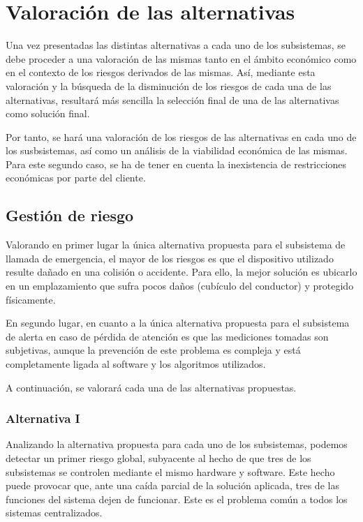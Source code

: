 \section{Valoración de las alternativas}
\par Una vez presentadas las distintas alternativas a cada uno de los subsistemas, se debe proceder a una valoración de las mismas tanto en el ámbito económico como en el contexto de los riesgos derivados de las mismas. Así, mediante esta valoración y la búsqueda de la disminución de los riesgos de cada una de las alternativas, resultará más sencilla la selección final de una de las alternativas como solución final.

\par Por tanto, se hará una valoración de los riesgos de las alternativas en cada uno de los susbsistemas, así como un análisis de la viabilidad económica de las mismas. Para este segundo caso, se ha de tener en cuenta la inexistencia de restricciones económicas por parte del cliente.


\subsection{Gestión de riesgo}
\par Valorando en primer lugar la única alternativa propuesta para el subsistema de llamada de emergencia, el mayor de los riesgos es que el dispositivo utilizado resulte dañado en una colisión o accidente. Para ello, la mejor solución es ubicarlo en un emplazamiento que sufra pocos daños (cubículo del conductor) y protegido físicamente.

\par En segundo lugar, en cuanto a la única alternativa propuesta para el subsistema de alerta en caso de pérdida de atención es que las mediciones tomadas son subjetivas, aunque la prevención de este problema es compleja y está completamente ligada al software y los algoritmos utilizados.

\par A continuación, se valorará cada una de las alternativas propuestas.

\subsubsection{Alternativa I}
Analizando la alternativa propuesta para cada uno de los subsistemas, podemos detectar un primer riesgo global, subyacente al hecho de que tres de los subsistemas se controlen mediante el mismo hardware y software. Este hecho puede provocar que, ante una caída parcial de la solución aplicada, tres de las funciones del sistema dejen de funcionar. Este es el problema común a todos los sistemas centralizados.

